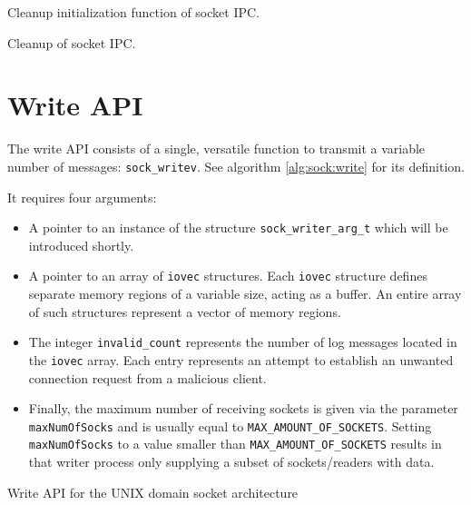 \begin{algorithm}[h!]
    
    \caption[Socket: Socket finalization]{Cleanup initialization function of socket \ac{IPC}.}
    \label{alg:sock:finalize}
\end{algorithm}

\begin{algorithm}[h!]
    
    \caption[Socket: Socket cleanup]{Cleanup of socket \ac{IPC}.}
    \label{alg:sock:cleanup}
\end{algorithm}

\section{Write \ac{API}}
\label{cha:WriteAPI}
The write \ac{API} consists of a single, versatile function to transmit a variable number of messages\@: \texttt{sock\_writev}.
See algorithm \ref{alg:sock:write} for its definition.

It requires four arguments:
\begin{itemize}
    \item A pointer to an instance of the structure \texttt{sock\_writer\_arg\_t} which will be introduced shortly.
    \item A pointer to an array of \texttt{iovec} structures.
            Each \texttt{iovec} structure defines separate memory regions of a variable size, acting as a buffer.
            An entire array of such structures represent a vector of memory regions\cite{man:iovec}.
    \item The integer \texttt{invalid\_count} represents the number of log messages located in the \texttt{iovec} array.
            Each entry represents an attempt to establish an unwanted connection request from a malicious client.  
    \item Finally, the maximum number of receiving sockets is given via the parameter \\\texttt{maxNumOfSocks} and is usually equal to \texttt{MAX\_AMOUNT\_OF\_SOCKETS}.
            Setting \texttt{maxNumOfSocks} to a value smaller than \texttt{MAX\_AMOUNT\_OF\_SOCKETS} results in that writer process only supplying a subset of sockets/readers with data.
\end{itemize}

\begin{algorithm}[h!]
    
    \caption[Socket: Write \ac{API}]{Write \ac{API} for the UNIX domain socket architecture}
    \label{alg:sock:write}
\end{algorithm}


